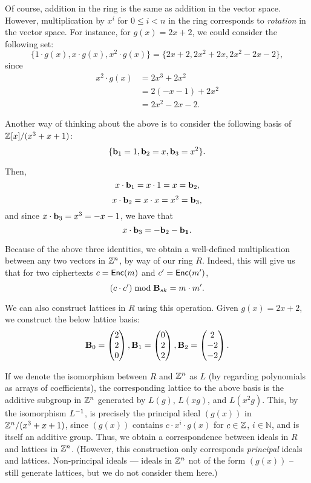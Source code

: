Of course, addition in the ring is the same as addition in the vector space. However, multiplication by $x^i$ for $0 \leq i < n$ in the ring corresponds to \emph{rotation} in the vector space. For instance, for $g(x) = 2x + 2$, we could consider the following set:
\[\{1 \cdot g(x), x \cdot g(x), x^2 \cdot g(x)\} = \{2x+2, 2x^2 + 2x, 2x^2 -2x - 2\},\]
since
\begin{align*}
    x^2 \cdot g(x) &= 2x^3 + 2x^2\\
    &= 2(-x - 1) + 2x^2 \\
    &= 2x^2 -2x - 2.
\end{align*}


Another way of thinking about the above is to consider the following basis of $\mathbb{Z}[x] /(x^3 + x + 1)$:
\[\{{\bf b}_1 = 1, {\bf b}_2 = x, {\bf b}_3 = x^2\}.\]

Then,
\[x \cdot {\bf b}_1 = x \cdot 1 = x = {\bf b}_2,\]
\[x \cdot {\bf b}_2 = x \cdot x = x^2 = {\bf b}_3,\] and since $x \cdot {\bf b}_3 = x^3 = -x - 1$, we have that
\[x \cdot {\bf b}_3 = -{\bf b}_2 - {\bf b_1}.\]

Because of the above three identities, we obtain a well-defined multiplication between any two vectors in $\mathbb{Z}^n$, by way of our ring $R$. Indeed, this will give us that for two ciphertexts $c = {\sf Enc}(m)$ and $c' = {\sf Enc}(m')$,
\[(c \cdot c') \bmod \textbf{B}_{sk} = m \cdot m'.\]



We can also construct lattices in $R$ using this operation. Given $g(x) = 2x + 2$, we construct the below lattice basis:
\[\textbf{B}_0 = \begin{pmatrix} 2 \\ 2 \\ 0 \end{pmatrix}, \textbf{B}_1 = \begin{pmatrix} 0 \\ 2 \\ 2 \end{pmatrix}, \textbf{B}_2 = \begin{pmatrix} 2 \\ -2 \\ -2 \end{pmatrix}.\]

If we denote the isomorphism between $R$ and $\mathbb{Z}^n$ as $L$ (by regarding polynomials as arrays of coefficients), the corresponding lattice to the above basis is the additive subgroup in $\mathbb{Z}^n$ generated by $L(g)$, $L(xg)$, and $L(x^2g)$. This, by the isomorphism $L ^{-1}$, is precisely the principal ideal $(g(x))$ in $\mathbb{Z}^n / (x^3 + x + 1)$, since $(g(x))$ contains $c \cdot x^i \cdot g(x)$ for  $c \in \mathbb{Z}$, $i \in \mathbb{N}$, and is itself an additive group. Thus, we obtain a correspondence between ideals in $R$ and lattices in  $\mathbb{Z}^n$. (However, this construction only corresponds \emph{principal} ideals and lattices. Non-principal ideals --- ideals in $\mathbb{Z}^n$ not of the form $(g(x))$ -- still generate lattices, but we do not consider them here.)

